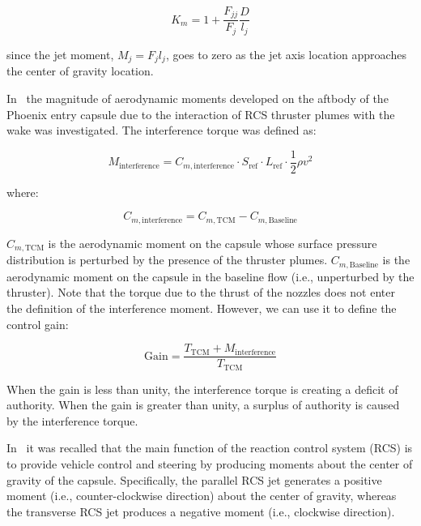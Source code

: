 \documentclass[12pt]{article}
\begin{document}
\begin{equation}
    K_m = 1 + \frac{F_{jj}}{F_j} \frac{D}{l_j}
\end{equation}

since the jet moment, $M_j = F_j l_j$, goes to zero as the jet axis location approaches the center of gravity location.

In~\cite{dyakonov2011analysis} the magnitude of aerodynamic moments developed on the aftbody of the Phoenix entry capsule due to the interaction of RCS thruster plumes with the wake was investigated. The interference torque was defined as:

\begin{equation}
M_{\text{interference}} = C_{m,\text{interference}} \cdot S_{\text{ref}} \cdot L_{\text{ref}} \cdot \frac{1}{2} \rho v^2
\label{eq:interference_torque}
\end{equation}

where:

\begin{equation}
C_{m,\text{interference}} = C_{m,\text{TCM}} - C_{m,\text{Baseline}}
\label{eq:Cm_interference}
\end{equation}

$C_{m,\text{TCM}}$ is the aerodynamic moment on the capsule whose surface pressure distribution is perturbed by the presence of the thruster plumes. $C_{m,\text{Baseline}}$ is the aerodynamic moment on the capsule in the baseline flow (i.e., unperturbed by the thruster). Note that the torque due to the thrust of the nozzles does not enter the definition of the interference moment. However, we can use it to define the control gain:

\begin{equation}
\text{Gain} = \frac{T_{\text{TCM}} + M_{\text{interference}}}{T_{\text{TCM}}}
\label{eq:control_gain}
\end{equation}

When the gain is less than unity, the interference torque is creating a deficit of authority. When the gain is greater than unity, a surplus of authority is caused by the interference torque.

In~\cite{alkandry2012aerodynamic,dyakonov2009aerodynamic} it was recalled that the main function of the reaction control system (RCS) is to provide vehicle control and steering by producing moments about the center of gravity of the capsule. Specifically, the parallel RCS jet generates a positive moment (i.e., counter-clockwise direction) about the center of gravity, whereas the transverse RCS jet produces a negative moment (i.e., clockwise direction).
\end{document}
